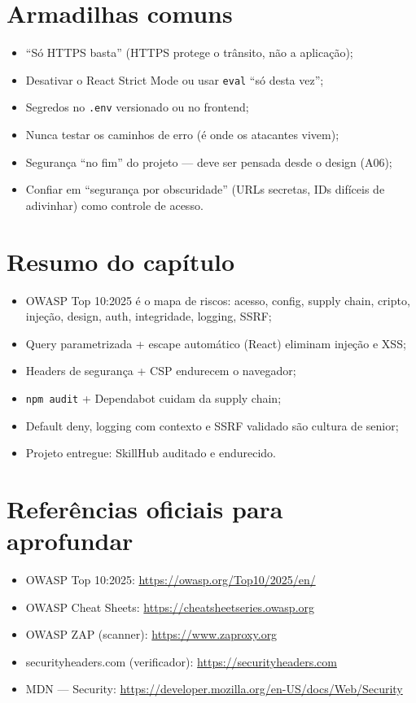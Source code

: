 \section{Armadilhas comuns}

\begin{itemize}[leftmargin=*, itemsep=0.4em]
  \item ``Só HTTPS basta'' (HTTPS protege o trânsito, não a aplicação);
  \item Desativar o React Strict Mode ou usar \texttt{eval} ``só desta vez'';
  \item Segredos no \texttt{.env} versionado ou no frontend;
  \item Nunca testar os caminhos de erro (é onde os atacantes vivem);
  \item Segurança ``no fim'' do projeto — deve ser pensada desde o design (A06);
  \item Confiar em ``segurança por obscuridade'' (URLs secretas, IDs difíceis de adivinhar) como controle de acesso.
\end{itemize}

\section{Resumo do capítulo}

\begin{itemize}[leftmargin=*, itemsep=0.3em]
  \item OWASP Top 10:2025 é o mapa de riscos: acesso, config, supply chain, cripto, injeção, design, auth, integridade, logging, SSRF;
  \item Query parametrizada + escape automático (React) eliminam injeção e XSS;
  \item Headers de segurança + CSP endurecem o navegador;
  \item \texttt{npm audit} + Dependabot cuidam da supply chain;
  \item Default deny, logging com contexto e SSRF validado são cultura de senior;
  \item Projeto entregue: SkillHub auditado e endurecido.
\end{itemize}

\section{Referências oficiais para aprofundar}

\begin{itemize}[leftmargin=*, itemsep=0.3em]
  \item OWASP Top 10:2025: \url{https://owasp.org/Top10/2025/en/}
  \item OWASP Cheat Sheets: \url{https://cheatsheetseries.owasp.org}
  \item OWASP ZAP (scanner): \url{https://www.zaproxy.org}
  \item securityheaders.com (verificador): \url{https://securityheaders.com}
  \item MDN — Security: \url{https://developer.mozilla.org/en-US/docs/Web/Security}
\end{itemize}
